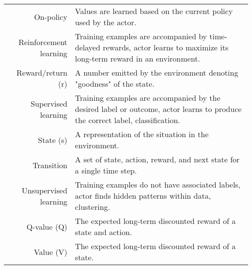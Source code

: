 \begin{longtable}{@{}r|Y@{}}
	On-policy & Values are learned based on the current policy used by the actor. \\
	Reinforcement learning & Training examples are accompanied by time-delayed rewards, actor learns to maximize its long-term reward in an environment. \\
	Reward/return (r) & A number emitted by the environment denoting "goodness" of the state. \\
	Supervised learning & Training examples are accompanied by the desired label or outcome, actor learns to produce the correct label, classification. \\
	State (s) & A representation of the situation in the environment. \\
	Transition & A set of state, action, reward, and next state for a single time step. \\
	Unsupervised learning & Training examples do not have associated labels, actor finds hidden patterns within data, clustering.  \\
	Q-value (Q) & The expected long-term discounted reward of a state and action. \\
	Value (V) & The expected long-term discounted reward of a state. \\
	\bottomrule 
\end{longtable} 
